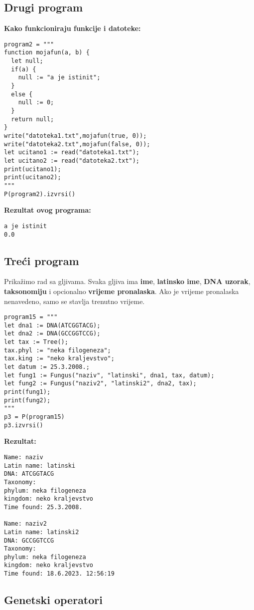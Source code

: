 \documentclass{article}
\begin{document}
\subsection{Drugi program}
\textbf{Kako funkcioniraju funkcije i datoteke:}
\begin{lstlisting}
program2 = """
function mojafun(a, b) {
  let null;
  if(a) {
    null := "a je istinit";
  }
  else {
    null := 0;
  }
  return null;
}
write("datoteka1.txt",mojafun(true, 0));
write("datoteka2.txt",mojafun(false, 0));
let ucitano1 := read("datoteka1.txt");
let ucitano2 := read("datoteka2.txt");
print(ucitano1);
print(ucitano2);
"""
P(program2).izvrsi()
\end{lstlisting}
\textbf{Rezultat ovog programa:}
\begin{lstlisting}
a je istinit
0.0
\end{lstlisting}
\subsection{Treći program}
Prikažimo rad sa gljivama. Svaka gljiva ima \textbf{ime}, \textbf{latinsko ime}, \textbf{DNA uzorak}, \textbf{taksonomiju} i opcionalno
\textbf{vrijeme pronalaska}. Ako je vrijeme pronalaska nenavedeno, samo se stavlja trenutno vrijeme.
\begin{lstlisting}
program15 = """
let dna1 := DNA(ATCGGTACG);
let dna2 := DNA(GCCGGTCCG);
let tax := Tree();
tax.phyl := "neka filogeneza";
tax.king := "neko kraljevstvo";
let datum := 25.3.2008.;
let fung1 := Fungus("naziv", "latinski", dna1, tax, datum);
let fung2 := Fungus("naziv2", "latinski2", dna2, tax);
print(fung1);
print(fung2);
"""
p3 = P(program15)
p3.izvrsi()
\end{lstlisting}
\textbf{Rezultat:}
\begin{lstlisting}
Name: naziv
Latin name: latinski
DNA: ATCGGTACG
Taxonomy: 
phylum: neka filogeneza
kingdom: neko kraljevstvo
Time found: 25.3.2008.

Name: naziv2
Latin name: latinski2
DNA: GCCGGTCCG
Taxonomy: 
phylum: neka filogeneza
kingdom: neko kraljevstvo
Time found: 18.6.2023. 12:56:19

\end{lstlisting}
\subsection{Genetski operatori}
\end{document}
